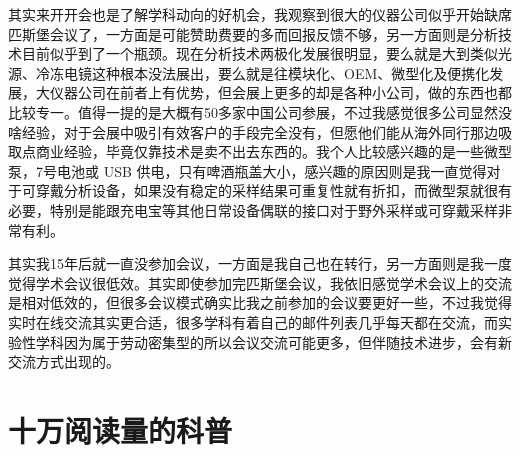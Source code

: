 \documentclass[
]{book}
\begin{document}
其实来开开会也是了解学科动向的好机会，我观察到很大的仪器公司似乎开始缺席匹斯堡会议了，一方面是可能赞助费要的多而回报反馈不够，另一方面则是分析技术目前似乎到了一个瓶颈。现在分析技术两极化发展很明显，要么就是大到类似光源、冷冻电镜这种根本没法展出，要么就是往模块化、OEM、微型化及便携化发展，大仪器公司在前者上有优势，但会展上更多的却是各种小公司，做的东西也都比较专一。值得一提的是大概有50多家中国公司参展，不过我感觉很多公司显然没啥经验，对于会展中吸引有效客户的手段完全没有，但愿他们能从海外同行那边吸取点商业经验，毕竟仅靠技术是卖不出去东西的。我个人比较感兴趣的是一些微型泵，7号电池或 USB 供电，只有啤酒瓶盖大小，感兴趣的原因则是我一直觉得对于可穿戴分析设备，如果没有稳定的采样结果可重复性就有折扣，而微型泵就很有必要，特别是能跟充电宝等其他日常设备偶联的接口对于野外采样或可穿戴采样非常有利。

其实我15年后就一直没参加会议，一方面是我自己也在转行，另一方面则是我一度觉得学术会议很低效。其实即使参加完匹斯堡会议，我依旧感觉学术会议上的交流是相对低效的，但很多会议模式确实比我之前参加的会议要更好一些，不过我觉得实时在线交流其实更合适，很多学科有着自己的邮件列表几乎每天都在交流，而实验性学科因为属于劳动密集型的所以会议交流可能更多，但伴随技术进步，会有新交流方式出现的。

\hypertarget{ux5341ux4e07ux9605ux8bfbux91cfux7684ux79d1ux666e}{%
\section{十万阅读量的科普}\label{ux5341ux4e07ux9605ux8bfbux91cfux7684ux79d1ux666e}}
\end{document}
